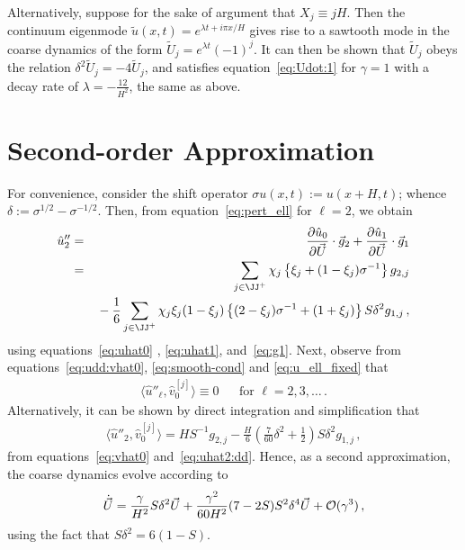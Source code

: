 \documentclass[12pt,a5paper]{article}
\begin{document}
Alternatively, suppose for the sake of argument that $X_j\equiv jH$. Then the continuum eigenmode $\tilde{u}(x,t)=e^{\lambda t+i\pi x/H}$ 
gives rise to a sawtooth mode in the coarse dynamics of the form $\tilde{U}_j=e^{\lambda t}(-1)^{j}$.
It can then be shown that $\tilde{U}_j$ obeys the relation $\delta^2\tilde{U}_j=-4\tilde{U}_j$,
and satisfies equation~\eqref{eq:Udot:1} for $\gamma=1$ with a decay rate of $\lambda=-\frac{12}{H^2}$, the same as above.

\section{Second-order Approximation}
For convenience, consider the shift operator $\sigma u(x,t) := u(x+H,t)$;
 whence $\delta:=\sigma^{{1}/{2}}-\sigma^{-{1}/{2}}$.
Then, from equation~\eqref{eq:pert_ell} for $\ell=2$, we obtain
\begin{eqnarray}
  \hat{u}''_2 & = & \D{\vec U}{\hat{u}_0}\cdot{\vec g}_{2}+\D{\vec U}{\hat{u}_1}\cdot{\vec g}_{1}
\nonumber\\
& = & \sum_{j\in\JJ^+}\chi_j\left\{\xi_j+(1-\xi_j)\sigma^{-1}\right\}g_{2,j}
\nonumber\\
&& {}-\frac{1}{6}\sum_{j\in\JJ^+}\chi_j\xi_j(1-\xi_j)\left\{
(2-\xi_j)\sigma^{-1}+(1+\xi_j)
\right\}S\delta^2g_{1,j}\,,
\label{eq:uhat2:dd}
\end{eqnarray}
using equations~\eqref{eq:uhat0} , \eqref{eq:uhat1}, and~\eqref{eq:g1}.
Next, observe 
from equations~\eqref{eq:udd:vhat0}, \eqref{eq:smooth-cond} and \eqref{eq:u_ell_fixed} that
\begin{eqnarray}
\langle\hat{u}''_\ell,\hat{v}_0^{[j]}\rangle\equiv0 && \mbox{for }\ell=2,3,\ldots\,.
\end{eqnarray}
Alternatively, it can be shown by direct integration and simplification that
\begin{eqnarray}
\langle\hat{u}''_2,\hat{v}_0^{[j]}\rangle = HS^{-1}g_{2,j}-\frac{H}{6}\left(\frac{7}{60}\delta^2+\frac{1}{2}\right)S\delta^2g_{1,j}\,,
\end{eqnarray}
from equations~\eqref{eq:vhat0} and~\eqref{eq:uhat2:dd}.
Hence, as a second approximation, the coarse dynamics evolve according to
\begin{eqnarray}
	\dot{\vec U} = \frac{\gamma}{H^2}S\delta^2\vec U 
+ \frac{\gamma^2}{60H^2}(7-2S)S^2\delta^4\vec U
+ {\cal O}(\gamma^3)\,,
\end{eqnarray}
using the fact that $S\delta^2=6(1-S)$.
\end{document}
